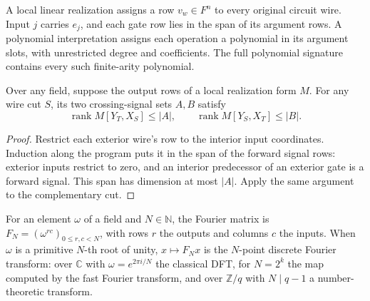 \begin{definition}
  \label{def:lowerbounds-algebraic-polynomial-realization}
  \leanok
  A local linear realization assigns a row $v_w\in F^n$ to every original
  circuit wire. Input $j$ carries $e_j$, and each gate row lies in the span
  of its argument rows. A polynomial interpretation assigns each operation a
  polynomial in its argument slots, with unrestricted degree and coefficients.
  The full polynomial signature contains every such finite-arity polynomial.
\end{definition}

\begin{lemma}
  \label{lem:lowerbounds-algebraic-linear-realization-cut}
  \leanok
  Over any field, suppose the output rows of a local realization form $M$.
  For any wire cut $S$, its two crossing-signal sets $A,B$ satisfy
  \[
    \operatorname{rank}M[Y_T,X_S]\le |A|,\qquad
    \operatorname{rank}M[Y_S,X_T]\le |B|.
  \]
\end{lemma}
\begin{proof}
  \leanok
  Restrict each exterior wire's row to the interior input coordinates.
  Induction along the program puts it in the span of the forward signal rows:
  exterior inputs restrict to zero, and an interior predecessor of an exterior
  gate is a forward signal. This span has dimension at most $|A|$.
  Apply the same argument to the complementary cut.
\end{proof}

\begin{definition}
  \label{def:lowerbounds-algebraic-dft}
  \leanok
  For an element $\omega$ of a field and $N\in\mathbb{N}$, the Fourier matrix is
  $F_N=(\omega^{rc})_{0\le r,c<N}$, with rows $r$ the outputs and columns $c$ the inputs. When
  $\omega$ is a primitive $N$-th root of unity, $x\mapsto F_Nx$ is the $N$-point discrete Fourier
  transform: over $\mathbb{C}$ with $\omega=e^{2\pi i/N}$ the classical DFT, for $N=2^k$ the
  map computed by the fast Fourier transform, and over $\mathbb{Z}/q$ with $N\mid q-1$ a
  number-theoretic transform.
\end{definition}

